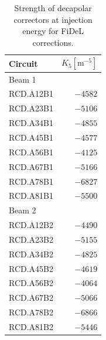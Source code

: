 \begin{table}
    \centering
    \begin{tabular}{lr}
        \toprule
        Circuit   & $K_5 [\textrm{m}^{-5}]$ \\
        \midrule
        Beam 1    & \\
        \hspace{2mm}RCD.A12B1 & $-4582$ \\
        \hspace{2mm}RCD.A23B1 & $-5106$ \\
        \hspace{2mm}RCD.A34B1 & $-4855$ \\
        \hspace{2mm}RCD.A45B1 & $-4577$ \\
        \hspace{2mm}RCD.A56B1 & $-4125$ \\
        \hspace{2mm}RCD.A67B1 & $-5166$ \\
        \hspace{2mm}RCD.A78B1 & $-6827$ \\
        \hspace{2mm}RCD.A81B1 & $-5500$ \\
        Beam 2    & \\
        \hspace{2mm}RCD.A12B2 & $-4490$ \\
        \hspace{2mm}RCD.A23B2 & $-5155$ \\
        \hspace{2mm}RCD.A34B2 & $-4825$ \\
        \hspace{2mm}RCD.A45B2 & $-4619$ \\
        \hspace{2mm}RCD.A56B2 & $-4064$ \\
        \hspace{2mm}RCD.A67B2 & $-5066$ \\
        \hspace{2mm}RCD.A78B2 & $-6866$ \\
        \hspace{2mm}RCD.A81B2 & $-5446$ \\
        \bottomrule
    \end{tabular}
    \caption{Strength of decapolar correctors at injection energy for FiDeL corrections.}
    \label{tab:decapoles:strength_rcd_fidel}
\end{table}


